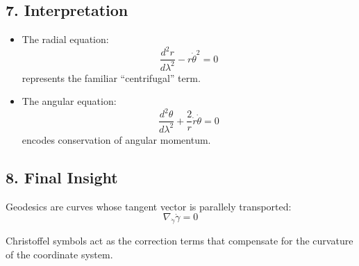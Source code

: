 \documentclass{article}
\begin{document}
	\subsection*{7. Interpretation}
	
	\begin{itemize}
		\item The radial equation:
		\[
		\frac{d^2 r}{d\lambda^2} - r\dot{\theta}^2 = 0
		\]
		represents the familiar ``centrifugal'' term.
		
		\item The angular equation:
		\[
		\frac{d^2 \theta}{d\lambda^2}
		+ \frac{2}{r}\dot{r}\dot{\theta} = 0
		\]
		encodes conservation of angular momentum.
		
	\end{itemize}
	
	\subsection*{8. Final Insight}
	
	Geodesics are curves whose tangent vector is parallely transported:
	\[
	\nabla_{\dot{\gamma}} \dot{\gamma} = 0
	\]
	
	Christoffel symbols act as the correction terms that compensate for the curvature of the coordinate system.
	
\end{document}
